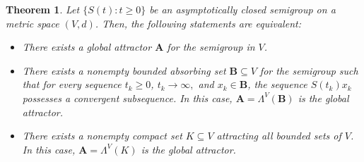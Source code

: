 \documentclass[a4paper,12pt,reqno]{amsart}
\theoremstyle{plain}
\newtheorem{thm}[lem]{Theorem}
\theoremstyle{definition}
\numberwithin{equation}{section}
\renewcommand{\geq}{\geqslant}
\begin{document}
\begin{thm}\label{thm:existglobal}
Let $\{S(t)\colon t\geq 0\}$ be an asymptotically closed semigroup on a metric space $(V,d)$. Then, the following statements are equivalent:
\begin{itemize}
\item[$(1)$] There exists a global attractor $\mathbf{A}$ for the semigroup in $V$.
\item[$(2)$] There exists a nonempty bounded absorbing set $\mathbf{B}\subseteq V$ for the semigroup such that 
for every sequence $t_k\geq 0$, $t_k\to\infty,$ and $x_k\in \mathbf{B}$, the sequence $S(t_k)x_k$ possesses a convergent subsequence. In this case, $\mathbf{A}=\displaystyle\Lambda^{V}(\mathbf{B})$ is the global attractor.
\item[$(3)$] There exists a nonempty compact set $K\subseteq V$ attracting all bounded sets of $V$. In this case, $\mathbf{A}=\displaystyle\Lambda^{V}(K)$ is the global attractor.
\end{itemize}
\end{thm}
\end{document}
